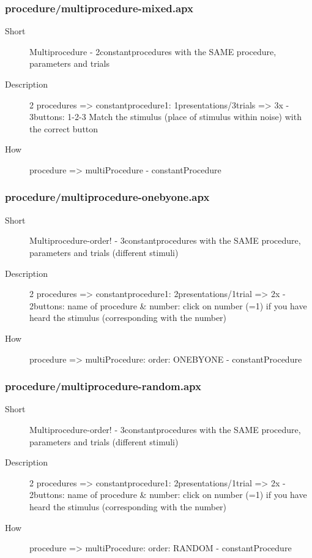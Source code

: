 \subsubsection{procedure/multiprocedure-mixed.apx}
\begin{description}
\item[Short] 
 Multiprocedure - 2constantprocedures with the SAME procedure, parameters and trials
\item[Description] 
 2 procedures =\textgreater{} constantprocedure1: 1presentations/3trials =\textgreater{} 3x - 3buttons: 1-2-3 Match the stimulus (place of stimulus within noise) with the correct button
\item[How] 
 procedure =\textgreater{} multiProcedure - constantProcedure
\end{description}

\subsubsection{procedure/multiprocedure-onebyone.apx}
\begin{description}
\item[Short] 
 Multiprocedure-order! - 3constantprocedures with the SAME procedure, parameters and trials (different stimuli)
\item[Description] 
 2 procedures =\textgreater{} constantprocedure1: 2presentations/1trial =\textgreater{} 2x - 2buttons: name of procedure \& number: click on number (=1) if you have heard the stimulus (corresponding with the number)
\item[How] 
 procedure =\textgreater{} multiProcedure: order: ONEBYONE - constantProcedure
\end{description}

\subsubsection{procedure/multiprocedure-random.apx}
\begin{description}
\item[Short] 
 Multiprocedure-order! - 3constantprocedures with the SAME procedure, parameters and trials (different stimuli)
\item[Description] 
 2 procedures =\textgreater{} constantprocedure1: 2presentations/1trial =\textgreater{} 2x - 2buttons: name of procedure \& number: click on number (=1) if you have heard the stimulus (corresponding with the number)
\item[How] 
 procedure =\textgreater{} multiProcedure: order: RANDOM - constantProcedure
\end{description}

